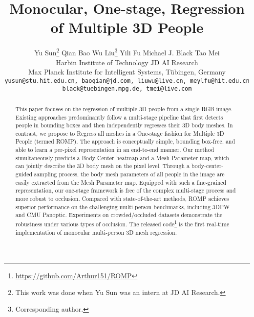 \documentclass[10pt,twocolumn,letterpaper]{article}
\begin{document}
\title{Monocular, One-stage, Regression of Multiple 3D People\vspace{-8mm}}


\author{Yu Sun\thanks{This work was done when Yu Sun was an intern at JD AI Research. }\quad
Qian Bao \quad
Wu Liu\thanks{Corresponding author.} \quad
Yili Fu\quad
Michael J. Black \quad
Tao Mei\\\vspace{-2.5mm}
Harbin Institute of Technology \quad JD AI Research \\
Max Planck Institute for Intelligent Systems, T\"ubingen, Germany\\
{\tt\small \texttt{yusun@stu.hit.edu.cn, baoqian@jd.com, liuwu@live.cn, meylfu@hit.edu.cn}}\\\vspace{-1mm}
{\tt\small\texttt{black@tuebingen.mpg.de, tmei@live.com}}
}

\maketitle
\ificcvfinal\thispagestyle{empty}\fi

\begin{abstract}
This paper focuses on the regression of multiple 3D people from a single RGB image. Existing approaches predominantly follow a multi-stage pipeline that first detects people in bounding boxes and then independently regresses their 3D body meshes. In contrast, we propose to Regress all meshes in a One-stage fashion for Multiple 3D People (termed ROMP). The approach is conceptually simple, bounding box-free, and able to learn a per-pixel representation in an end-to-end manner. Our method simultaneously predicts a Body Center heatmap and a Mesh Parameter map, which can jointly describe the 3D body mesh on the pixel level. Through a body-center-guided sampling process, the body mesh parameters of all people in the image are easily extracted from the Mesh Parameter map. Equipped with such a fine-grained representation, our one-stage framework is free of the complex multi-stage process and more robust to occlusion. Compared with state-of-the-art methods, ROMP achieves superior performance on the challenging multi-person benchmarks, including 3DPW and CMU Panoptic. Experiments on crowded/occluded datasets demonstrate the robustness under various types of occlusion. The released code\footnote{\url{https://github.com/Arthur151/ROMP}} is the first real-time implementation of monocular multi-person 3D mesh regression.

\end{abstract}
\vspace{-3mm}
\end{document}
